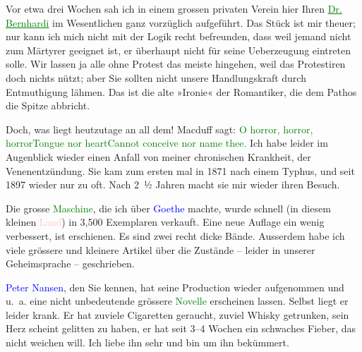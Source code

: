 \pstart
           Vor etwa drei Wochen sah ich in {\pb}einem grossen privaten Verein hier Ihren \textcolor{green}{\uline{Dr. Bernhardi}}{}\ledrightnote{\textcolor{green}{Professor Bernhardi. Komödie in fünf Akten}} im Wesentlichen ganz vorzüglich aufgeführt. Das Stück ist mir theuer; nur kann
               ich mich nicht mit der Logik recht befreunden, dass weil jemand nicht zum Märtyrer
               geeignet ist, er überhaupt nicht für seine Ueberzeugung eintreten solle. Wir lassen
               ja alle ohne Protest das meiste hingehen, weil das Protestiren doch nichts nützt;
               aber Sie sollten nicht unsere Handlungskraft durch Entmuthigung lähmen. Das ist die
               alte »Ironie« der Romantiker, die dem Pathos die Spitze abbricht.\pend
           
\pstart
           Doch, was liegt heutzutage an all dem! Macduff sagt:\pend
           \stanza{}\textcolor{green}{O horror, horror, horror}{}\ledrightnote{{$\rightarrow$}\textcolor{green}{Macbeth}}\newverse{}\textcolor{green}{Tongue nor heart}{}\ledrightnote{{$\rightarrow$}\textcolor{green}{Macbeth}}\newverse{}\textcolor{green}{Cannot conceive nor name
                     thee.}{}\ledrightnote{{$\rightarrow$}\textcolor{green}{Macbeth}}\stanzaend{}
\pstart
           {\pb}Ich habe leider im Augenblick
               wieder einen Anfall von meiner chronischen Krankheit, der Venenentzündung. Sie kam
               zum ersten mal in 1871 nach einem Typhus, und seit 1897
               wieder nur zu oft. Nach 2 ½ Jahren macht sie mir wieder ihren Besuch.\pend
           
\pstart
           Die grosse \textcolor{green}{Maschine}{}\ledrightnote{{$\rightarrow$}\textcolor{green}{Wolfgang Goethe}}, die ich
               über \textcolor{blue}{Goethe}{}\ledrightnote{\textcolor{blue}{Johann Wolfgang von Goethe}} machte, wurde schnell (in diesem
               kleinen \textcolor{pink}{Land}{}\ledrightnote{{$\rightarrow$}\textcolor{pink}{Dänemark}}) in 3,500
               Exemplaren verkauft. Eine neue Auflage ein wenig verbessert, ist erschienen. Es sind
               zwei recht dicke Bände. Ausserdem habe ich viele grössere und kleinere Artikel über
               die Zustände – leider in unserer Geheimsprache – geschrieben.\pend
           
\pstart
           \textcolor{blue}{Peter Nansen}{}\ledrightnote{\textcolor{blue}{Peter Nansen}}, den Sie kennen, hat seine
               Production wieder aufgenommen und u. a. eine nicht unbedeutende grössere \textcolor{green}{Novelle}{}\ledrightnote{{$\rightarrow$}\textcolor{green}{Die Brüder Menthe}} erscheinen lassen.
               Selbst liegt er leider krank. Er hat zuviele {\pb}Cigaretten geraucht, zuviel Whisky
               getrunken, sein Herz scheint gelitten zu haben, er hat seit 3–4 Wochen ein schwaches Fieber, das nicht weichen will. Ich liebe
               ihn sehr und bin um ihn bekümmert.\pend
           
